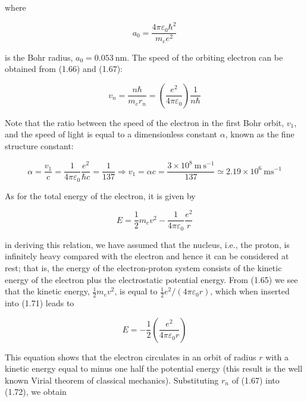 \documentclass[10pt]{article}
\begin{document}
where


\begin{equation*}
a_{0}=\frac{4 \pi \varepsilon_{0} \hbar^{2}}{m_{e} e^{2}} \tag{1.68}
\end{equation*}


is the Bohr radius, $a_{0}=0.053 \mathrm{~nm}$. The speed of the orbiting electron can be obtained from (1.66) and (1.67):


\begin{equation*}
v_{n}=\frac{n \hbar}{m_{e} r_{n}}=\left(\frac{e^{2}}{4 \pi \varepsilon_{0}}\right) \frac{1}{n \hbar} \tag{1.69}
\end{equation*}


Note that the ratio between the speed of the electron in the first Bohr orbit, $v_{1}$, and the speed of light is equal to a dimensionless constant $\alpha$, known as the fine structure constant:


\begin{equation*}
\alpha=\frac{v_{1}}{c}=\frac{1}{4 \pi \varepsilon_{0}} \frac{e^{2}}{\hbar c}=\frac{1}{137} \Rightarrow v_{1}=\alpha c=\frac{3 \times 10^{8} \mathrm{~m} \mathrm{~s}^{-1}}{137} \simeq 2.19 \times 10^{6} \mathrm{~ms}^{-1} \tag{1.70}
\end{equation*}


As for the total energy of the electron, it is given by


\begin{equation*}
E=\frac{1}{2} m_{e} v^{2}-\frac{1}{4 \pi \varepsilon_{0}} \frac{e^{2}}{r} \tag{1.71}
\end{equation*}


in deriving this relation, we have assumed that the nucleus, i.e., the proton, is infinitely heavy compared with the electron and hence it can be considered at rest; that is, the energy of the electron-proton system consists of the kinetic energy of the electron plus the electrostatic potential energy. From (1.65) we see that the kinetic energy, $\frac{1}{2} m_{e} v^{2}$, is equal to $\frac{1}{2} e^{2} /\left(4 \pi \varepsilon_{0} r\right)$, which when inserted into (1.71) leads to


\begin{equation*}
E=-\frac{1}{2}\left(\frac{e^{2}}{4 \pi \varepsilon_{0} r}\right) \tag{1.72}
\end{equation*}


This equation shows that the electron circulates in an orbit of radius $r$ with a kinetic energy equal to minus one half the potential energy (this result is the well known Virial theorem of classical mechanics). Substituting $r_{n}$ of (1.67) into (1.72), we obtain
\end{document}
